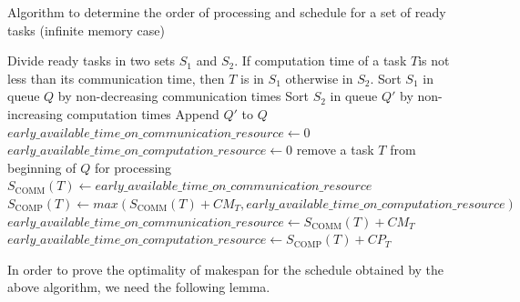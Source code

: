 \documentclass[sigconf]{acmart}
\newcommand{\scomm}{\ensuremath{{S}_{\text{COMM}}}}
\newcommand{\scomp}{\ensuremath{{S}_{\text{COMP}}}}
\begin{document}
	\begin{algorithm}
		\caption{\label{alg:OrderOfExecutionInfinteMemory}Algorithm to determine the order of processing and schedule for a set of ready tasks (infinite memory case)}
		\begin{algorithmic}[1]
			\STATE Divide ready tasks in two sets $S_1$ and $S_2$. If computation time of a task $T$is not less than its communication time, then $T$ is in $S_1$ otherwise in $S_2$.
			\STATE Sort $S_1$ in queue $Q$ by non-decreasing communication times
			\STATE Sort $S_2$ in queue $Q'$ by non-increasing computation times
			\STATE Append $Q'$ to $Q$
			\STATE $early\_available\_time\_on\_communication\_resource \gets 0$
			\STATE $early\_available\_time\_on\_computation\_resource \gets 0$
			\STATE remove a task $T$ from beginning of $Q$ for processing
			\STATE $\scomm(T) \gets  early\_available\_time\_on\_communication\_resource$
			\STATE $\scomp(T) \gets  max(\scomm(T) + CM_T, early\_available\_time\_on\_computation\_resource)$
			\STATE $early\_available\_time\_on\_communication\_resource \gets  \scomm(T) + CM_T$
			\STATE $early\_available\_time\_on\_computation\_resource \gets  \scomp(T) + CP_T$
			\ENDWHILE
		\end{algorithmic}
	\end{algorithm}
	
	In order to prove the optimality of makespan for the schedule obtained by the above algorithm, we need the following lemma.
	
\end{document}

